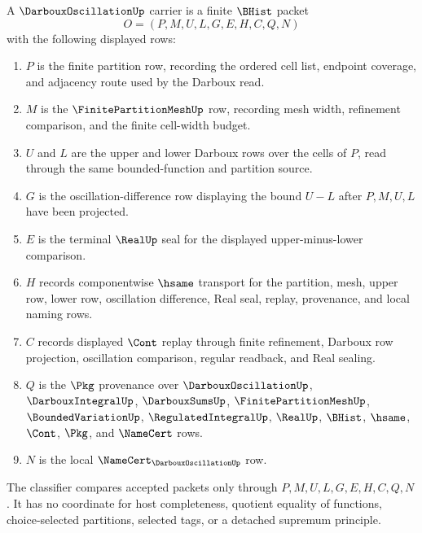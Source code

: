 \begin{definition}\label{def:darboux-oscillation-carrier}
A $\DarbouxOscillationUp$ carrier is a finite $\BHist$ packet
$$
O=(P,M,U,L,G,E,H,C,Q,N)
$$
with the following displayed rows:
\begin{enumerate}
\item $P$ is the finite partition row, recording the ordered cell list, endpoint coverage, and adjacency route used by the Darboux read.
\item $M$ is the $\FinitePartitionMeshUp$ row, recording mesh width, refinement comparison, and the finite cell-width budget.
\item $U$ and $L$ are the upper and lower Darboux rows over the cells of $P$, read through the same bounded-function and partition source.
\item $G$ is the oscillation-difference row displaying the bound $U-L$ after $P,M,U,L$ have been projected.
\item $E$ is the terminal $\RealUp$ seal for the displayed upper-minus-lower comparison.
\item $H$ records componentwise $\hsame$ transport for the partition, mesh, upper row, lower row, oscillation difference, Real seal, replay, provenance, and local naming rows.
\item $C$ records displayed $\Cont$ replay through finite refinement, Darboux row projection, oscillation comparison, regular readback, and Real sealing.
\item $Q$ is the $\Pkg$ provenance over $\DarbouxOscillationUp$, $\DarbouxIntegralUp$, $\DarbouxSumsUp$, $\FinitePartitionMeshUp$, $\BoundedVariationUp$, $\RegulatedIntegralUp$, $\RealUp$, $\BHist$, $\hsame$, $\Cont$, $\Pkg$, and $\NameCert$ rows.
\item $N$ is the local $\NameCert_{\DarbouxOscillationUp}$ row.
\end{enumerate}
The classifier compares accepted packets only through $P,M,U,L,G,E,H,C,Q,N$. It has no coordinate for host completeness, quotient equality of functions, choice-selected partitions, selected tags, or a detached supremum principle.
\end{definition}

